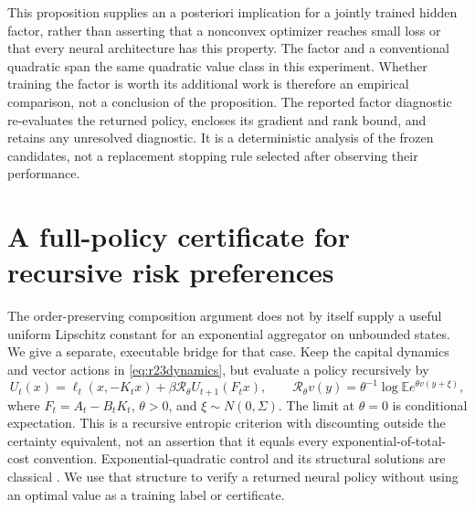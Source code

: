 \documentclass[ecta,nameyear,draft]{econsocart}
\theoremstyle{definition}
\theoremstyle{remark}
\newcommand{\E}{\mathbb E}
\begin{document}
This proposition supplies an a posteriori implication for a jointly trained
hidden factor, rather than asserting that a nonconvex optimizer reaches
small loss or that every neural architecture has this property. The factor
and a conventional quadratic span the same quadratic value class in this
experiment. Whether training the factor is worth its additional work is
therefore an empirical comparison, not a conclusion of the proposition.
The reported factor diagnostic re-evaluates the returned policy, encloses
its gradient and rank bound, and retains any unresolved diagnostic. It is a
deterministic analysis of the frozen candidates, not a replacement stopping
rule selected after observing their performance.

\section{A full-policy certificate for recursive risk preferences}
\label{sec:r27entropic}
The order-preserving composition argument does not by itself supply a useful
uniform Lipschitz constant for an exponential aggregator on unbounded states.
We give a separate, executable bridge for that case. Keep the capital dynamics
and vector actions in \eqref{eq:r23dynamics}, but evaluate a policy recursively by
\begin{equation}\label{eq:r27entropicbellman}
 U_t(x)=\ell_t(x,-K_tx)+\beta\mathcal R_\theta U_{t+1}(F_tx),
 \qquad \mathcal R_\theta v(y)=\theta^{-1}\log\E e^{\theta v(y+\xi)},
\end{equation}
where $F_t=A_t-B_tK_t$, $\theta>0$, and $\xi\sim N(0,\Sigma)$.
The limit at $\theta=0$ is conditional expectation. This is a recursive
entropic criterion with discounting outside the certainty equivalent, not an
assertion that it equals every exponential-of-total-cost convention.
Exponential-quadratic control and its structural solutions are classical
\citep{r27jacobson1973,r27cui2023}. We use that structure to verify a returned
neural policy without using an optimal value as a training label or certificate.
\end{document}
